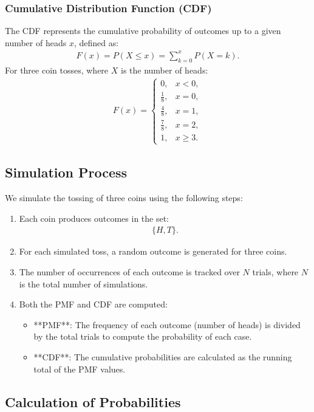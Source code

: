 \documentclass[article]{IEEEtran}
\numberwithin{figure}{enumi}
\begin{document}
\subsubsection*{Cumulative Distribution Function (CDF)}
The CDF represents the cumulative probability of outcomes up to a given number of heads $ x $, defined as:
\begin{align}
F(x) = P(X \leq x) = \sum_{k=0}^{x} P(X = k).
\end{align}
For three coin tosses, where $ X $ is the number of heads:
\begin{align}
F(x) =
\begin{cases}
0, & x < 0, \\
\frac{1}{8}, & x = 0, \\
\frac{4}{8}, & x = 1, \\
\frac{7}{8}, & x = 2, \\
1, & x \geq 3.
\end{cases}
\end{align}

\subsection*{Simulation Process}
We simulate the tossing of three coins using the following steps:
\begin{enumerate}
    \item Each coin produces outcomes in the set:
    \begin{align}
    \{H, T\}.
    \end{align}
    \item For each simulated toss, a random outcome is generated for three coins.
    \item The number of occurrences of each outcome is tracked over $ N $ trials, where $ N $ is the total number of simulations.
    \item Both the PMF and CDF are computed:
    \begin{itemize}
        \item **PMF**: The frequency of each outcome (number of heads) is divided by the total trials to compute the probability of each case.
        \item **CDF**: The cumulative probabilities are calculated as the running total of the PMF values.
    \end{itemize}
\end{enumerate}

\subsection*{Calculation of Probabilities}
\end{document}
